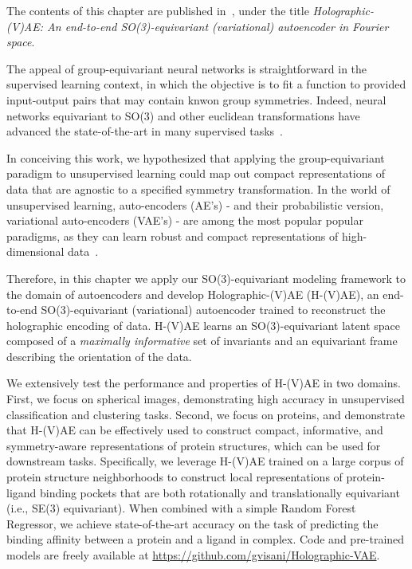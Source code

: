 
The contents of this chapter are published in~\citet{visani_holographic-vae_2024}, under the title
\textit{Holographic-(V)AE: An end-to-end SO(3)-equivariant (variational) autoencoder in Fourier space}.

The appeal of group-equivariant neural networks is straightforward in the supervised learning context,
in which the objective is to fit a function to provided input-output pairs that may contain knwon
group symmetries. Indeed, neural networks equivariant to SO(3) and other euclidean transformations
have advanced the state-of-the-art in many supervised tasks~\citep{weiler_3d_2018, thomas_tensor_2018,
fuchs_se3-transformers_2020, brandstetter_geometric_2022, batzner_e3-equivariant_2022, musaelian_learning_2022,
satorras_en_2022, liao_equiformer_2022}.

In conceiving this work, we hypothesized that applying the group-equivariant paradigm to
unsupervised learning could map out compact representations of data that are agnostic to a specified
symmetry transformation. In the world of unsupervised learning, auto-encoders (AE's) - and their
probabilistic version, variational auto-encoders (VAE's) - are among the most popular popular paradigms,
as they can learn robust and compact representations of high-dimensional data~\cite{kingma_auto-encoding_2013}.

Therefore, in this chapter we apply our SO(3)-equivariant modeling framework to the domain of autoencoders
and develop Holographic-(V)AE (H-(V)AE), an end-to-end SO(3)-equivariant (variational) autoencoder trained
to reconstruct the holographic encoding of data. H-(V)AE learns an SO(3)-equivariant latent space composed
of a \textit{maximally informative} set of invariants and an equivariant frame describing the orientation of
the data.

We extensively test the performance and properties of H-(V)AE in two domains. First, we focus on
spherical images, demonstrating high accuracy in unsupervised classification and clustering
tasks. Second, we focus on proteins, and demonstrate that H-(V)AE can be effectively
used to construct compact, informative, and symmetry-aware representations of protein structures,
which can be used for downstream tasks. Specifically, we leverage H-(V)AE trained on a large corpus
of protein structure neighborhoods to construct local representations of protein-ligand
binding pockets that are both rotationally and translationally equivariant (i.e., SE(3)
equivariant). When combined with a simple Random Forest Regressor, we achieve state-of-the-art
accuracy on the task of  predicting the binding affinity between a protein and a ligand in complex.
Code and pre-trained models are freely available at
\href{https://github.com/gvisani/Holographic-VAE}{https://github.com/gvisani/Holographic-VAE}.

